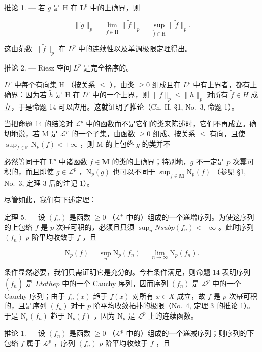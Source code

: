 推论 1. --- 若 \(\widetilde{g}\) 是 H 在 \(\mathbf{L}^p\) 中的上确界，则

\[
\| \widetilde {g} \| _ {p} = \lim _ {\widetilde {f} \in \mathrm{H}} \| \widetilde {f} \| _ {p} = \sup _ {\widetilde {f} \in \mathrm{H}} \| \widetilde {f} \| _ {p}.\tag{10}
\]

这由范数 \(\|\widetilde{f}\|_{p}\) 在 \(L^{p}\) 中的连续性以及单调极限定理得出。

推论 2. --- Riesz 空间 \(L^{p}\) 是完全格序的。

\(L^{p}\) 中每个有向集 H （按关系 \(\leqslant\) ），由类 \(\geqslant 0\) 组成且在 \(L^{p}\) 中有上界者，都有上确界：因为若 \(\widetilde{h}\) 是 H 在 \(L^{p}\) 中的一个上界，则 \(\|f\|_{p} \leqslant \|h\|_{p}\) 对所有 \(\widetilde{f} \in H\) 成立，于是命题 14 可以应用。这就证明了推论（Ch. II, §1, No.~3, 命题 1）。

当把命题 14 的结论对 \(\mathcal{L}^p\) 中的函数而不是它们的类来陈述时，它们不再成立。确切地说，若 M 是 \(\mathcal{L}^p\) 的一个子集，由函数 \(\geqslant 0\) 组成、按关系 \(\leqslant\) 有向，且使 \(\sup_{f\in\mathbb{M}}\mathrm{N}_{p}(f)<+\infty\) ，则 M 的上包络 \(g\) 的类并不

必然等同于在 \(\mathrm{L}^p\) 中诸函数 \(f \in \mathbf{M}\) 的类的上确界；特别地，\(g\) 不一定是 \(p\) 次幂可积的，而且即使 \(g \in \mathcal{L}^p\) ，\(\mathrm{N}_p(g)\) 也可以不同于 \(\sup_{f \in \mathbf{M}} \mathrm{N}_p(f)\) （参见 §1, No.~3, 定理 3 后的注记 1）。

尽管如此，我们有下述定理：

定理 5. --- 设 \((f_n)\) 是函数 \(\geqslant 0\) （\(\mathcal{L}^p\) 中的）组成的一个递增序列。为使这序列的上包络 \(f\) 是 \(p\) 次幂可积的，必须且只须 \(\sup_{n} N sub p(f_n) < +\infty\) 。此时序列 \((f_n)\) \(p\) 阶平均收敛于 \(f\) ，且

\[
\mathrm{N} _ {p} (f) = \sup _ {n} \mathrm{N} _ {p} (f _ {n}) = \lim _ {n \rightarrow \infty} \mathrm{N} _ {p} (f _ {n}).\tag{11}
\]

条件显然必要，我们只需证明它是充分的。今若条件满足，则命题 14 表明序列 \((\tilde{f}_n)\) 是 \(L to the p\) 中的一个 Cauchy 序列，因而序列 \((f_n)\) 是 \(\mathcal{L}^p\) 中的一个 Cauchy 序列；由于 \(f_n(x)\) 趋于 \(f(x)\) 对所有 \(x \in X\) 成立，故 \(f\) 是 \(p\) 次幂可积的，且是序列 \((f_n)\) 对于 \(p\) 阶平均收敛拓扑的极限（No.~4, 定理 3 的推论 1）。于是 \(\mathrm{N}_p(f_n)\) 趋于 \(\mathrm{N}_p(f)\) ，因为 \(\mathrm{N}_p\) 是 \(\mathcal{L}^p\) 上的连续函数。

推论 1. --- 设 \((f_n)\) 是函数 \(\geqslant 0\) （\(\mathcal{L}^p\) 中的）组成的一个递减序列；则序列的下包络 \(f\) 属于 \(\mathcal{L}^p\) ，序列 \((f_n)\) \(p\) 阶平均收敛于 \(f\) ，且

